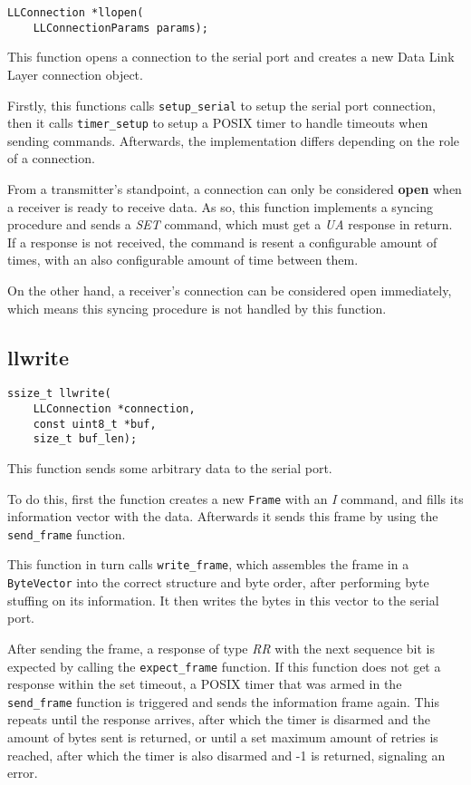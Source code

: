 \documentclass[11pt,a4paper,twocolumn]{article}
\begin{document}
\begin{lstlisting}
LLConnection *llopen(
    LLConnectionParams params);
\end{lstlisting}

This function opens a connection to the serial port and creates a new Data Link Layer connection object.

Firstly, this functions calls \lstinline{setup_serial} to setup the serial port connection, then it calls \lstinline{timer_setup} to setup a POSIX timer to handle timeouts when sending commands.
Afterwards, the implementation differs depending on the role of a connection.

From a transmitter's standpoint, a connection can only be considered \textbf{open} when a receiver is ready to receive data.
As so, this function implements a syncing procedure and sends a \textit{SET} command, which must get a \textit{UA} response in return.
If a response is not received, the command is resent a configurable amount of times, with an also configurable amount of time between them.

On the other hand, a receiver's connection can be considered open immediately, which means this syncing procedure is not handled by this function.

\subsection{llwrite}

\begin{lstlisting}
ssize_t llwrite(
    LLConnection *connection, 
    const uint8_t *buf, 
    size_t buf_len);
\end{lstlisting}

This function sends some arbitrary data to the serial port.

To do this, first the function creates a new \lstinline{Frame} with an \textit{I} command, and fills its information vector with the data.
Afterwards it sends this frame by using the \lstinline{send_frame} function.

This function in turn calls \lstinline{write_frame}, which assembles the frame in a \lstinline{ByteVector} into the correct structure and byte order, after performing byte stuffing on its information.
It then writes the bytes in this vector to the serial port.

After sending the frame, a response of type \textit{RR} with the next sequence bit is expected by calling the \lstinline{expect_frame} function.
If this function does not get a response within the set timeout, a POSIX timer that was armed in the \lstinline{send_frame} function is triggered and sends the information frame again.
This repeats until the response arrives, after which the timer is disarmed and the amount of bytes sent is returned, or until a set maximum amount of retries is reached, after which the timer is also disarmed and -1 is returned, signaling an error.
\end{document}
